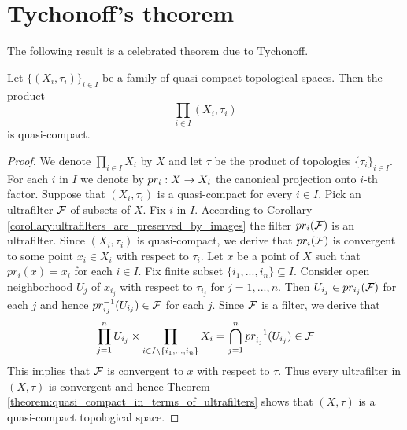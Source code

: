 \section{Tychonoff's theorem}
\noindent
The following result is a celebrated theorem due to Tychonoff.

\begin{theorem}\label{theorem:Tychonoff_theorem}
Let $\big\{\left(X_i,\tau_i\right)\big\}_{i\in I}$ be a family of quasi-compact topological spaces. Then the product
$$\prod_{i\in I}\left(X_i,\tau_i\right)$$
is quasi-compact.
\end{theorem}
\begin{proof}
We denote $\prod_{i\in I}X_i$ by $X$ and let $\tau$ be the product of topologies $\{\tau_i\}_{i\in I}$. For each $i$ in $I$ we denote by $pr_i:X \rightarrow X_i$ the canonical projection onto $i$-th factor. Suppose that $\left(X_i,\tau_i\right)$ is a quasi-compact for every $i\in I$. Pick an ultrafilter ${\mathcal F}$ of subsets of $X$. Fix $i$ in $I$. According to Corollary \ref{corollary:ultrafilters_are_preserved_by_images} the filter $pr_i({\mathcal F})$ is an ultrafilter. Since $\left(X_i,\tau_i\right)$ is quasi-compact, we derive that $pr_i({\mathcal F})$ is convergent to some point $x_i\in X_i$ with respect to $\tau_i$. Let $x$ be a point of $X$ such that $pr_i(x) = x_i$ for each $i\in I$. Fix finite subset $\{i_1,...,i_n\}\subseteq I$. Consider open neighborhood $U_j$ of $x_{i_j}$ with respect to $\tau_{i_j}$ for $j=1,...,n$. Then $U_{i_j}\in pr_{i_j}({\mathcal F})$ for each $j$ and hence $pr_{i_j}^{-1}(U_{i_j}) \in {\mathcal F}$ for each $j$. Since ${\mathcal F}$ is a filter, we derive that
$$\prod_{j=1}^nU_{i_j}\times \prod_{i\in I \setminus \{i_1,...,i_n\}}X_i = \bigcap_{j=1}^npr^{-1}_{i_j}(U_{i_j}) \in {\mathcal F}$$
This implies that ${\mathcal F}$ is convergent to $x$ with respect to $\tau$. Thus every ultrafilter in $(X,\tau)$ is convergent and hence Theorem \ref{theorem:quasi_compact_in_terms_of_ultrafilters} shows that $\left(X,\tau\right)$ is a quasi-compact topological space.
\end{proof}


